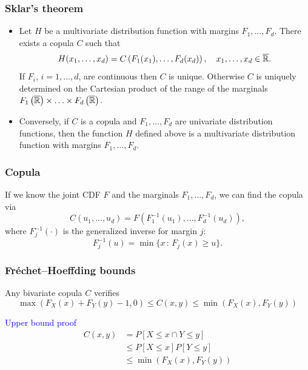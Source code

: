 \documentclass{beamer}
\begin{document}
\begin{frame}
\frametitle{Sklar's theorem}

\begin{theorem}
	\begin{itemize}
		\item 
	Let $H$ be a multivariate distribution function with margins $F_1,\ldots, F_d$.
	There exists a copula $C$ such that
$$
		H(x_1, \ldots, x_d) = C \left( F_1(x_1), \ldots, F_d(x_d) \right), \quad x_1, \ldots, x_d \in \overline{{\mathbb{R}}}.
$$
	If $F_i$, $i = 1, \ldots, d$, are continuous then $C$ is unique. Otherwise $C$ is uniquely determined on the Cartesian product of the range of the marginals $F_1 \left( \overline{{\mathbb{R}}} \right) \times \ldots \times F_d \left( \overline{{\mathbb{R}}} \right)$.
	\item
	Conversely, if $C$ is a copula and $F_1, \ldots, F_d$ are univariate distribution functions, then the function $H$ defined above is a multivariate distribution function with margins $F_1, \ldots, F_d$.
	\end{itemize}
\end{theorem}

\end{frame}

\begin{frame}
\frametitle{Copula}

If we know the joint CDF $F$ and the marginals $F_1,\ldots,F_d$, we can find the copula via
$$
C(u_1,\ldots,u_d) = F\left(F_1^{-1}(u_1),\ldots,F_d^{-1}(u_d)\right),
$$
where $F_j^{-1}(\cdot)$ is the generalized inverse for margin $j$:
$$
F_j^{-1}(u) = \min \{ x \,:\, F_j(x) \geq u \}.
$$

\end{frame}

\begin{frame}
\frametitle{Fréchet–Hoeffding bounds}

Any bivariate copula $C$ verifies
$$
\max(F_X(x) + F_Y(y) - 1, 0) \leq C(x, y) \leq \min(F_X(x), F_Y(y))
$$

\mbox{}

\textcolor{blue}{Upper bound proof}
	\begin{align*}
		C(x, y) &= P[X \leq x \cap Y \leq y] \\ & \leq P[X \leq x] P[Y \leq y] \\ & \leq \min(F_X(x), F_Y(y))
	\end{align*}

\end{frame}
\end{document}
